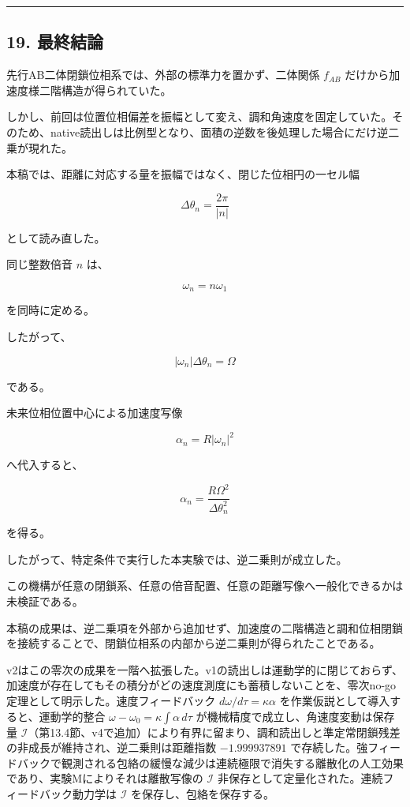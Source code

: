 \documentclass[
  a4paper,
]{ltjsarticle}
\begin{document}
\begin{center}\rule{0.5\linewidth}{0.5pt}\end{center}

\subsection{19. 最終結論}\label{ux6700ux7d42ux7d50ux8ad6}

先行AB二体閉鎖位相系では、外部の標準力を置かず、二体関係 \(f_{AB}\)
だけから加速度様二階構造が得られていた。

しかし、前回は位置位相偏差を振幅として変え、調和角速度を固定していた。そのため、native読出しは比例型となり、面積の逆数を後処理した場合にだけ逆二乗が現れた。

本稿では、距離に対応する量を振幅ではなく、閉じた位相円の一セル幅

\[
\Delta\theta_n=\frac{2\pi}{|n|}
\]

として読み直した。

同じ整数倍音 \(n\) は、

\[
\omega_n=n\omega_1
\]

を同時に定める。

したがって、

\[
|\omega_n|\Delta\theta_n=\Omega
\]

である。

未来位相位置中心による加速度写像

\[
\alpha_n=R|\omega_n|^2
\]

へ代入すると、

\[
\boxed{
\alpha_n
=\frac{R\Omega^2}{\Delta\theta_n^2}
}
\]

を得る。

したがって、特定条件で実行した本実験では、逆二乗則が成立した。

この機構が任意の閉鎖系、任意の倍音配置、任意の距離写像へ一般化できるかは未検証である。

本稿の成果は、逆二乗項を外部から追加せず、加速度の二階構造と調和位相閉鎖を接続することで、閉鎖位相系の内部から逆二乗則が得られたことである。

v2はこの零次の成果を一階へ拡張した。v1の読出しは運動学的に閉じておらず、加速度が存在してもその積分がどの速度測度にも蓄積しないことを、零次no-go定理として明示した。速度フィードバック
\(d\omega/d\tau=\kappa\alpha\) を作業仮説として導入すると、運動学的整合
\(\omega-\omega_0=\kappa\int\alpha\,d\tau\)
が機械精度で成立し、角速度変動は保存量
\(\mathcal I\)（第13.4節、v4で追加）により有界に留まり、調和読出しと準定常閉鎖残差の非成長が維持され、逆二乗則は距離指数
\(-1.999937891\)
で存続した。強フィードバックで観測される包絡の緩慢な減少は連続極限で消失する離散化の人工効果であり、実験Mによりそれは離散写像の
\(\mathcal I\) 非保存として定量化された。連続フィードバック動力学は
\(\mathcal I\) を保存し、包絡を保存する。
\end{document}
